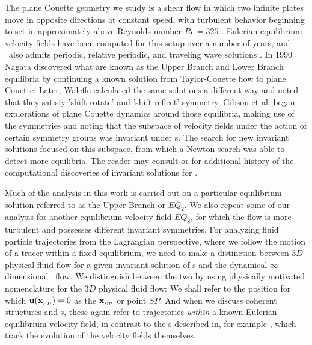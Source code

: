 The plane Couette geometry we study is a shear flow in which two infinite 
plates move in opposite directions at constant speed, with turbulent 
behavior beginning to set in approximately above Reynolds number $Re=325$ 
\cite{GHCV08}. Eulerian equilibrium velocity fields have been computed 
for this setup over a number of years, and \pCf\ also admits periodic, 
relative periodic, and traveling wave solutions \cite{GHCV08,DV04}.  In 
1990 Nagata \cite{N90} discovered what are known as the Upper Branch and 
Lower Branch equilibria by continuing a known solution from 
Taylor-Couette flow to plane Couette. Later, Waleffe \cite{W03} 
calculated the same solutions a different way and noted that they satisfy 
'shift-rotate' and 'shift-reflect' symmetry. Gibson et al. \cite{GHCW07} 
began explorations of plane Couette dynamics around those equilibria, 
making use of the symmetries and noting that the subspace of velocity 
fields under the action of certain symmetry groups was invariant under 
{\NSe}s. The search for new invariant solutions focused on this 
subspace, from which a Newton search was able to detect more equilibria. 
The reader may consult \cite{GHCV08} or \cite{GHCW07} for additional 
history of the computational discoveries of invariant solutions for 
{\pCf}. 

Much of the analysis in this work is carried out on a particular 
equilibrium solution referred to as the Upper Branch or $EQ_2$. We also 
repeat some of our analysis  for another equilibrium velocity field 
$EQ_8$, for which the flow is more turbulent and possesses different 
invariant symmetries. For analyzing fluid particle trajectories from the 
Lagrangian perspective, where we follow the motion of a tracer within a 
fixed equilibrium,  we need to make a distinction between $3D$ physical 
fluid flow for a given invariant solution of {\NSe}s and the dynamical 
$\infty$-dimensional \statesp\ flow. We distinguish between the two by 
using physically motivated nomenclature for the $3D$ physical fluid flow: 
We shall refer to the position for which ${\bf u}({\bf x}_{_{SP}})=0$ as the {\em 
\stagp} ${\bf x}_{_{SP}}$ or point $SP$. And when we discuss coherent 
structures and {\hc}s, these again refer to trajectories \textit{within} 
a known Eulerian equilibrium velocity field, in contrast to the {\hc}s 
described in, for example \cite{GHCV08}, which track the evolution of the 
velocity fields themselves. 

